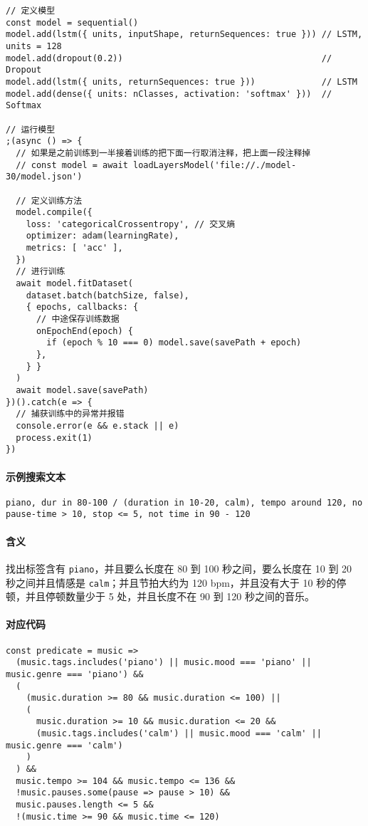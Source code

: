 \documentclass[a4paper,utf8,10pt]{article}
\begin{document}
 \label{lst:train}
\begin{verbatim}
// 定义模型
const model = sequential()
model.add(lstm({ units, inputShape, returnSequences: true })) // LSTM, units = 128
model.add(dropout(0.2))                                       // Dropout
model.add(lstm({ units, returnSequences: true }))             // LSTM
model.add(dense({ units: nClasses, activation: 'softmax' }))  // Softmax

// 运行模型
;(async () => {
  // 如果是之前训练到一半接着训练的把下面一行取消注释，把上面一段注释掉
  // const model = await loadLayersModel('file://./model-30/model.json')

  // 定义训练方法
  model.compile({
    loss: 'categoricalCrossentropy', // 交叉熵
    optimizer: adam(learningRate),
    metrics: [ 'acc' ],
  })
  // 进行训练
  await model.fitDataset(
    dataset.batch(batchSize, false),
    { epochs, callbacks: {
      // 中途保存训练数据
      onEpochEnd(epoch) {
        if (epoch % 10 === 0) model.save(savePath + epoch)
      },
    } }
  )
  await model.save(savePath)
})().catch(e => {
  // 捕获训练中的异常并报错
  console.error(e && e.stack || e)
  process.exit(1)
})
\end{verbatim}

 \label{lst:search}
\paragraph{示例搜索文本} \texttt{piano, dur in 80-100 / (duration in 10-20, calm), tempo around 120, no pause-time > 10, stop <= 5, not time in 90 - 120}
\paragraph{含义} 找出标签含有 \texttt{piano}，并且要么长度在 80 到 100 秒之间，要么长度在 10 到 20 秒之间并且情感是 \texttt{calm}；并且节拍大约为 120 bpm，并且没有大于 10 秒的停顿，并且停顿数量少于 5 处，并且长度不在 90 到 120 秒之间的音乐。
\paragraph{对应代码}
\begin{verbatim}
const predicate = music =>
  (music.tags.includes('piano') || music.mood === 'piano' || music.genre === 'piano') &&
  (
    (music.duration >= 80 && music.duration <= 100) ||
    (
      music.duration >= 10 && music.duration <= 20 &&
      (music.tags.includes('calm') || music.mood === 'calm' || music.genre === 'calm')
    )
  ) &&
  music.tempo >= 104 && music.tempo <= 136 &&
  !music.pauses.some(pause => pause > 10) &&
  music.pauses.length <= 5 &&
  !(music.time >= 90 && music.time <= 120)
\end{verbatim}
\end{document}
